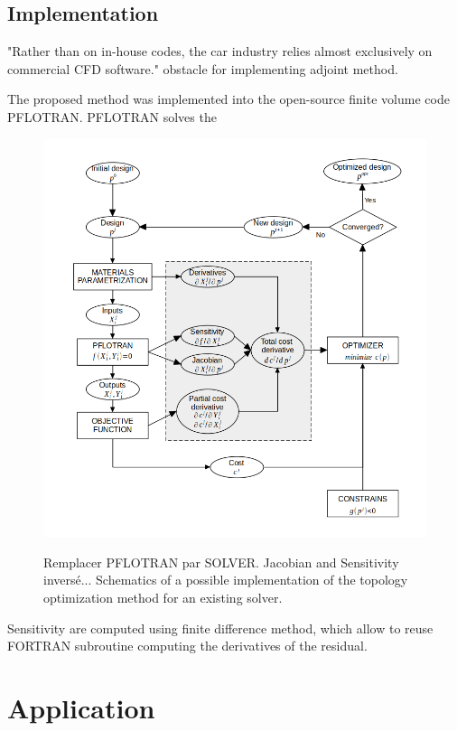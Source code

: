 \documentclass[11pt]{article}
\begin{document}
\subsection{Implementation}

"Rather than on in-house codes, the car industry relies almost exclusively on commercial CFD software." obstacle for implementing adjoint method. %

The proposed method was implemented into the open-source finite volume code PFLOTRAN. PFLOTRAN solves the 

\begin{figure}[]
  \centering
  \includegraphics[width=\textwidth]{figures/implementation_scheme.png}
  \label{cases_figure}
  \caption{Remplacer PFLOTRAN par SOLVER. Jacobian and Sensitivity inversé... Schematics of a possible implementation of the topology optimization method for an existing solver.}
\end{figure}

Sensitivity are computed using finite difference method, which allow to reuse FORTRAN subroutine computing the derivatives of the residual.




\section{Application}
\end{document}
